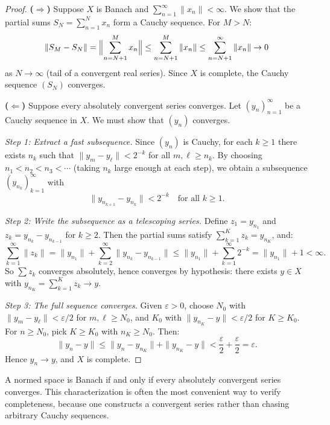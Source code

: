 \documentclass[11pt,a4paper]{article}
\begin{document}
\begin{proof}
\textbf{($\Rightarrow$)} Suppose $X$ is Banach and
$\sum_{n=1}^\infty \|x_n\| < \infty$. We show that the partial sums
$S_N = \sum_{n=1}^N x_n$ form a Cauchy sequence. For $M > N$:
\[
\|S_M - S_N\| = \Bigl\|\sum_{n=N+1}^M x_n\Bigr\|
\le \sum_{n=N+1}^M \|x_n\|
\le \sum_{n=N+1}^\infty \|x_n\| \to 0
\]
as $N \to \infty$ (tail of a convergent real series). Since $X$ is complete,
the Cauchy sequence $(S_N)$ converges.

\textbf{($\Leftarrow$)} Suppose every absolutely convergent series converges.
Let $(y_n)_{n=1}^\infty$ be a Cauchy sequence in $X$. We must show that
$(y_n)$ converges.

\emph{Step 1: Extract a fast subsequence.} Since $(y_n)$ is Cauchy, for each
$k \ge 1$ there exists $n_k$ such that $\|y_m - y_\ell\| < 2^{-k}$ for all
$m, \ell \ge n_k$. By choosing $n_1 < n_2 < n_3 < \cdots$ (taking $n_k$
large enough at each step), we obtain a subsequence $(y_{n_k})_{k=1}^\infty$
with
\[
\|y_{n_{k+1}} - y_{n_k}\| < 2^{-k} \quad \text{for all } k \ge 1.
\]

\emph{Step 2: Write the subsequence as a telescoping series.} Define
$z_1 = y_{n_1}$ and $z_k = y_{n_k} - y_{n_{k-1}}$ for $k \ge 2$. Then the
partial sums satisfy $\sum_{k=1}^K z_k = y_{n_K}$, and:
\[
\sum_{k=1}^\infty \|z_k\|
= \|y_{n_1}\| + \sum_{k=2}^\infty \|y_{n_k} - y_{n_{k-1}}\|
\le \|y_{n_1}\| + \sum_{k=1}^\infty 2^{-k}
= \|y_{n_1}\| + 1 < \infty.
\]
So $\sum z_k$ converges absolutely, hence converges by hypothesis: there
exists $y \in X$ with $y_{n_K} = \sum_{k=1}^K z_k \to y$.

\emph{Step 3: The full sequence converges.} Given $\varepsilon > 0$, choose
$N_0$ with $\|y_m - y_\ell\| < \varepsilon/2$ for $m, \ell \ge N_0$, and
$K_0$ with $\|y_{n_K} - y\| < \varepsilon/2$ for $K \ge K_0$. For
$n \ge N_0$, pick $K \ge K_0$ with $n_K \ge N_0$. Then:
\[
\|y_n - y\| \le \|y_n - y_{n_K}\| + \|y_{n_K} - y\|
< \frac{\varepsilon}{2} + \frac{\varepsilon}{2} = \varepsilon.
\]
Hence $y_n \to y$, and $X$ is complete.
\end{proof}

\begin{keyresult}[title={Banach Space Characterization}]
A normed space is Banach if and only if every absolutely convergent series
converges. This characterization is often the most convenient way to verify
completeness, because one constructs a convergent series rather than chasing
arbitrary Cauchy sequences.
\end{keyresult}
\end{document}
